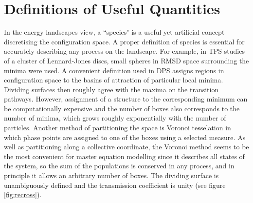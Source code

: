 \section{Definitions of Useful Quantities}

In the energy landscapes view, a ``species" is a useful yet artificial concept discretising the configuration space.
A proper definition of species is essential for accurately describing any process on the landscape.
For example, in TPS \cite{Dellago1998b} studies of a cluster of Lennard-Jones discs, small spheres in RMSD space surrounding the minima were used.
A convenient definition used in DPS assigns regions in configuration space to the basins of attraction of particular local minima.\cite{Wales2003}
Dividing surfaces then roughly agree with the maxima on the transition pathways.
However, assignment of a structure to the corresponding minimum can be computationally expensive and the number of boxes also corresponds to the number of minima, which grows roughly exponentially with the number of particles.
Another method of partitioning the space is Voronoi tesselation in which phase points are assigned to one of the boxes using a selected measure.
As well as partitioning along a collective coordinate, the Voronoi method seems to be the most convenient for master equation modelling since it describes all states of the system, so the sum of the populations is conserved in any process, and in principle it allows an arbitrary number of boxes.
The dividing surface is unambiguously defined and the transmission coefficient is unity (see figure \ref{fig:recross}).

